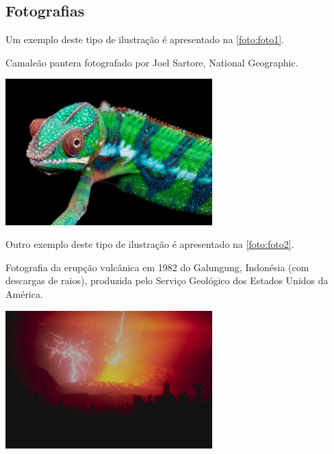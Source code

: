 \subsection{Fotografias}\label{sec:fotografias}

Um exemplo deste tipo de ilustra\c{c}\~ao \'e apresentado na \autoref{foto:foto1}.

\begin{photograph}[Htb]%
\captionsetup{width=0.6\textwidth}%
\caption{Camale\~ao pantera fotografado por Joel Sartore, National Geographic.}%
\label{foto:foto1}%
\includegraphics[width=0.6\textwidth]{./CapituloExemplo/foto1}%
\end{photograph}

Outro exemplo deste tipo de ilustra\c{c}\~ao \'e apresentado na \autoref{foto:foto2}.

\begin{photograph}[Htb]%
\captionsetup{width=0.6\textwidth}%
\caption{Fotografia da erup\c{c}\~ao vulc\^anica em 1982 do Galungung, Indon\'esia (com descargas de raios), produzida pelo Servi\c{c}o Geol\'ogico dos Estados Unidos da Am\'erica.}%
\label{foto:foto2}%
\includegraphics[width=0.6\textwidth]{./CapituloExemplo/foto2}%
\end{photograph}

